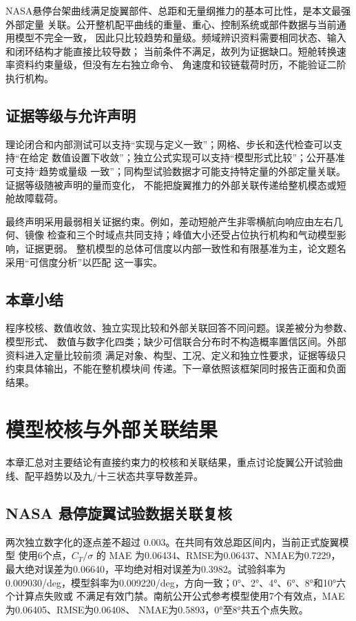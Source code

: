 \documentclass[UTF8,12pt,oneside,openany,fontset=windows]{ctexbook}
\begin{document}
NASA悬停台架曲线满足旋翼部件、总距和无量纲推力的基本可比性，是本文最强外部定量 关联。公开整机配平曲线的重量、重心、控制系统或部件数据与当前通用模型不完全一致， 因此只比较趋势和量级。频域辨识资料需要相同状态、输入和闭环结构才能直接比较导数； 当前条件不满足，故列为证据缺口。短舱转换速率资料约束量级，但没有左右独立命令、 角速度和铰链载荷时历，不能验证二阶执行机构。

\section{证据等级与允许声明}

理论闭合和内部测试可以支持“实现与定义一致”；网格、步长和迭代检查可以支持“在给定 数值设置下收敛”；独立公式实现可以支持“模型形式比较”；公开基准可支持“趋势或量级 一致”；同构型试验数据才可能支持特定量的外部定量关联。证据等级随被声明的量而变化， 不能把旋翼推力的外部关联传递给整机模态或短舱故障载荷。

最终声明采用最弱相关证据约束。例如，差动短舱产生非零横航向响应由左右几何、镜像 检查和三个时域点共同支持；峰值大小还受占位执行机构和气动模型影响，证据更弱。 整机模型的总体可信度以内部一致性和有限基准为主，论文题名采用“可信度分析”以匹配 这一事实。

\section{本章小结}

程序校核、数值收敛、独立实现比较和外部关联回答不同问题。误差被分为参数、模型形式、 数值与数字化四类；缺少可信联合分布时不构造概率置信区间。外部资料进入定量比较前须 满足对象、构型、工况、定义和独立性要求，证据等级只约束具体输出，不能在整机模块间 传递。下一章依照该框架同时报告正面和负面结果。

\chapter{模型校核与外部关联结果}

本章汇总对主要结论有直接约束力的校核和关联结果，重点讨论旋翼公开试验曲线、配平趋势以及九/十三状态共享导数差异。

\section{NASA 悬停旋翼试验数据关联复核}

两次独立数字化的逐点差不超过 \(0.003\)。在共同有效总距区间内，当前正式旋翼模型 使用6个点，\(C_T/\sigma\) 的 MAE 为0.06434、RMSE为0.06437、NMAE为0.7229， 最大绝对误差为0.06640，平均绝对相对误差为0.3982。试验斜率为 0.009030/deg，模型斜率为0.009220/deg，方向一致；0°、2°、4°、6°、8°和10°六个计算点失败或 不满足有效门禁。南航公开公式参考模型使用7个有效点，MAE为0.06405、RMSE为0.06408、 NMAE为0.5893，0°至8°共五个点失败。
\end{document}
